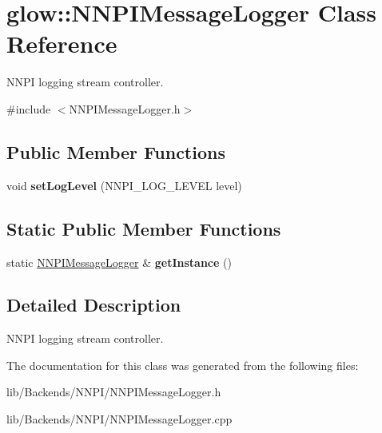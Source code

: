 \hypertarget{classglow_1_1_n_n_p_i_message_logger}{}\section{glow\+:\+:N\+N\+P\+I\+Message\+Logger Class Reference}
\label{classglow_1_1_n_n_p_i_message_logger}


N\+N\+PI logging stream controller.  




{\ttfamily \#include $<$N\+N\+P\+I\+Message\+Logger.\+h$>$}

\subsection*{Public Member Functions}
\begin{DoxyCompactItemize}
\item 
\mbox{\label{classglow_1_1_n_n_p_i_message_logger_a8e5f044e9c026817b16cba8d9d927571}} 
void {\bfseries set\+Log\+Level} (N\+N\+P\+I\+\_\+\+L\+O\+G\+\_\+\+L\+E\+V\+EL level)
\end{DoxyCompactItemize}
\subsection*{Static Public Member Functions}
\begin{DoxyCompactItemize}
\item 
\mbox{\label{classglow_1_1_n_n_p_i_message_logger_a8d10071a57d1c7522ef5aecf0cf939a9}} 
static \hyperlink{classglow_1_1_n_n_p_i_message_logger}{N\+N\+P\+I\+Message\+Logger} \& {\bfseries get\+Instance} ()
\end{DoxyCompactItemize}


\subsection{Detailed Description}
N\+N\+PI logging stream controller. 

The documentation for this class was generated from the following files\+:\begin{DoxyCompactItemize}
\item 
lib/\+Backends/\+N\+N\+P\+I/N\+N\+P\+I\+Message\+Logger.\+h\item 
lib/\+Backends/\+N\+N\+P\+I/N\+N\+P\+I\+Message\+Logger.\+cpp\end{DoxyCompactItemize}
